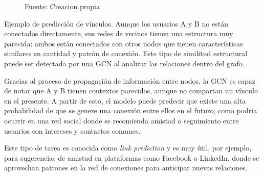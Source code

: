 \documentclass[11pt]{article} %
\begin{document}
\begin{figure}[H]
    \centering
    \caption*{Fuente: Creacion propia}
    \vspace{0.5em}
\end{figure}


\vspace{0.5em}
Ejemplo de predicción de vínculos. Aunque los usuarios A y B no están conectados directamente, sus redes de vecinos tienen una estructura muy parecida: ambos están conectados con otros nodos que tienen características similares en cantidad y patrón de conexión. Este tipo de similitud estructural puede ser detectada por una GCN al analizar las relaciones dentro del grafo.

Gracias al proceso de propagación de información entre nodos, la GCN es capaz de notar que A y B tienen contextos parecidos, aunque no compartan un vínculo en el presente. A partir de esto, el modelo puede predecir que existe una alta probabilidad de que se genere una conexión entre ellos en el futuro, como podría ocurrir en una red social donde se recomienda amistad o seguimiento entre usuarios con intereses y contactos comunes.

Este tipo de tarea es conocida como \textit{link prediction} y es muy útil, por ejemplo, para sugerencias de amistad en plataformas como Facebook o LinkedIn, donde se aprovechan patrones en la red de conexiones para anticipar nuevas relaciones.
\end{document}
